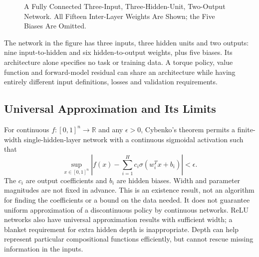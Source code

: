 \begin{figure}[htb]
\centering
{}
\caption{A Fully Connected Three-Input, Three-Hidden-Unit, Two-Output Network. All Fifteen Inter-Layer Weights Are Shown; the Five Biases Are Omitted.}
\label{fig:neural_network}
\end{figure}

The network in the figure has three inputs, three hidden units and two outputs: nine input-to-hidden and six hidden-to-output weights, plus five biases. Its architecture alone specifies no task or training data. A torque policy, value function and forward-model residual can share an architecture while having entirely different input definitions, losses and validation requirements.

\subsection{Universal Approximation and Its Limits}

For continuous $f:[0,1]^n\to\mathbb R$ and any $\epsilon>0$, Cybenko's theorem permits a finite-width single-hidden-layer network with a continuous sigmoidal activation such that
\begin{equation}
\sup_{x\in[0,1]^n}\left|f(x)-\sum_{i=1}^{H}c_i\sigma(w_i^Tx+b_i)\right|<\epsilon.
\end{equation}
The $c_i$ are output coefficients and $b_i$ are hidden biases. Width and parameter magnitudes are not fixed in advance. This is an existence result, not an algorithm for finding the coefficients or a bound on the data needed. It does not guarantee uniform approximation of a discontinuous policy by continuous networks. ReLU networks also have universal approximation results with sufficient width; a blanket requirement for extra hidden depth is inappropriate. Depth can help represent particular compositional functions efficiently, but cannot rescue missing information in the inputs.

